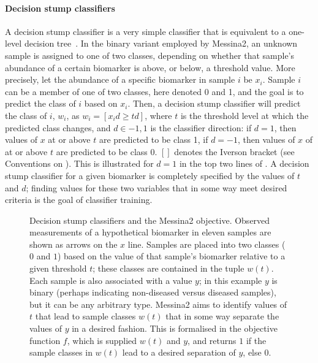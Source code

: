 \documentclass[dissertation.tex]{subfiles}
\begin{document}
\paragraph{Decision stump classifiers}
A decision stump classifier is a very simple classifier that is equivalent to a one-level decision tree~\cite{Iba1992}.  In the binary variant employed by Messina2, an unknown sample is assigned to one of two classes, depending on whether that sample's abundance of a certain biomarker is above, or below, a threshold value.  More precisely, let the abundance of a specific biomarker in sample $i$ be $x_i$.  Sample $i$ can be a member of one of two classes, here denoted 0 and 1, and the goal is to predict the class of $i$ based on $x_i$.  Then, a decision stump classifier will predict the class of $i$, $w_i$, as $w_i = [ x_i d \geq t d ]$, where $t$ is the threshold level at which the predicted class changes, and $d \in {-1, 1}$ is the classifier direction: if $d = 1$, then values of $x$ at or above $t$ are predicted to be class 1, if $d = -1$, then values of $x$ of at or above $t$ are predicted to be class 0.  $[ ]$ denotes the Iverson bracket (see Conventions on \pageref{chap:conventions}).  This is illustrated for $d = 1$ in the top two lines of .  A decision stump classifier for a given biomarker is completely specified by the values of $t$ and $d$; finding values for these two variables that in some way meet desired criteria is the goal of classifier training.

\begin{figure}[!htbp]
\centering
\def\svgwidth{\linewidth} 

\caption[Decision stump classifiers and the Messina2 objective]{Decision stump classifiers and the Messina2 objective.  Observed measurements of a hypothetical biomarker in eleven samples are shown as arrows on the $x$ line.  Samples are placed into two classes ($0$ and $1$) based on the value of that sample's biomarker relative to a given threshold $t$; these classes are contained in the tuple $w(t)$.  Each sample is also associated with a value $y$; in this example $y$ is binary (perhaps indicating non-diseased versus diseased samples), but it can be any arbitrary type.  Messina2 aims to identify values of $t$ that lead to sample classes $w(t)$ that in some way separate the values of $y$ in a desired fashion.  This is formalised in the objective function $f$, which is supplied $w(t)$ and $y$, and returns $1$ if the sample classes in $w(t)$ lead to a desired separation of $y$, else $0$.}\label{fig:mess-thresh-1}
\end{figure}
\end{document}
